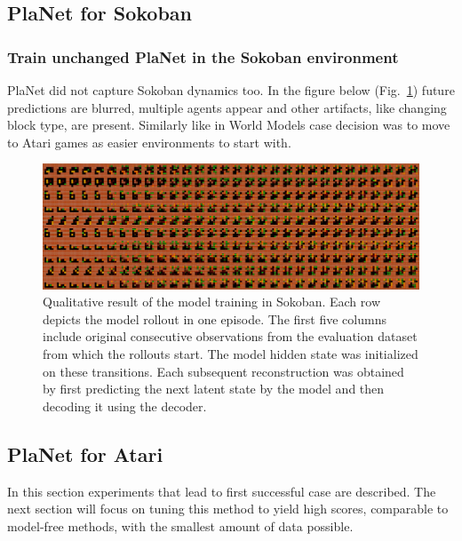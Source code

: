 \subsection{PlaNet for Sokoban}

\subsubsection{Train unchanged PlaNet in the Sokoban environment}

PlaNet did not capture Sokoban dynamics too. In the figure below (Fig.~\ref{Fig.PlaNet_Sokoban_openloop}) future predictions are blurred, multiple agents appear and other artifacts, like changing block type, are present. Similarly like in World Models case decision was to move to Atari games as easier environments to start with.

\begin{figure}[H]
\includegraphics[width=1\textwidth,keepaspectratio]{figures/PlaNet/Sokoban_memory.png}
\caption[Qualitative result of the PlaNet model training in Sokoban]{Qualitative result of the model training in Sokoban. Each row depicts the model rollout in one episode. The first five columns include original consecutive observations from the evaluation dataset from which the rollouts start. The model hidden state was initialized on these transitions. Each subsequent reconstruction was obtained by first predicting the next latent state by the model and then decoding it using the decoder.}
\label{Fig.PlaNet_Sokoban_openloop}
\end{figure}

\subsection{PlaNet for Atari}

In this section experiments that lead to first successful case are described. The next section will focus on tuning this method to yield high scores, comparable to model-free methods, with the smallest amount of data possible.

